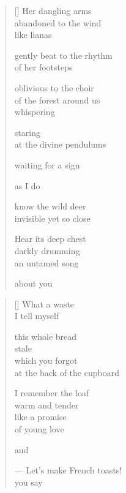 \documentclass[12pt,a4paper]{article}
\begin{document}
\newpage

\poemtitle{}

\settowidth{\versewidth}{gently beat to the rhythm}

\bigskip

\begin{verse}[\versewidth]
  Her dangling arms \\
  abandoned to the wind \\
  like lianas

  gently beat to the rhythm \\
  of her footsteps

  oblivious to the choir \\
  of the forest around us \\
  whispering

  staring \\
  at the divine pendulums

  waiting for a sign

  as I do

  know the wild deer \\
  invisible yet so close

  Hear its deep chest \\
  darkly drumming \\
  an untamed song

  about you
\end{verse}


\newpage

\poemtitle{}

\settowidth{\versewidth}{--- Let's make French toasts!}

\bigskip

\begin{verse}[\versewidth]
  What a waste \\
  I tell myself

  this whole bread \\
  stale \\
  which you forgot \\
  at the back of the cupboard

  I remember the loaf \\
  warm and tender \\
  like a promise \\
  of young love

  and

  --- Let's make French toasts! \\
  you say
\end{verse}
\end{document}
